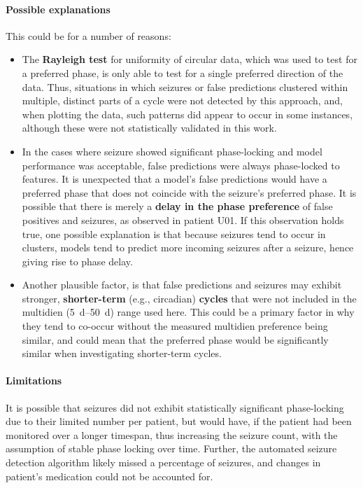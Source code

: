 \paragraph{Possible explanations}
This could be for a number of reasons:
\begin{itemize}
    \item
    The \textbf{Rayleigh test} for uniformity of circular data, which was used to test for a preferred phase, is only able to test for a single preferred direction of the data.
    Thus, situations in which seizures or false predictions clustered within multiple, distinct parts of a cycle were not detected by this approach, and, when plotting the data, such patterns did appear to occur in some instances, although these were not statistically validated in this work.

    \item
    In the cases where seizure showed significant phase-locking and model performance was acceptable, false predictions were always phase-locked to features. 
    It is unexpected that a model's false predictions would have a preferred phase that does not coincide with the seizure's preferred phase.
    It is possible that there is merely a \textbf{delay in the phase preference} of false positives and seizures, as observed in patient U01.
    If this observation holds true, one possible explanation is that because seizures tend to occur in clusters, models tend to predict more incoming seizures after a seizure, hence giving rise to phase delay.

    \item 
    Another plausible factor, is that false predictions and seizures may exhibit stronger, \textbf{shorter-term} (e.g., circadian) \textbf{cycles} that were not included in the multidien (\SIrange{5}{50}{\day}) range used here.
    This could be a primary factor in why they tend to co-occur without the measured multidien preference being similar, and could mean that the preferred phase would be significantly similar when investigating shorter-term cycles.
\end{itemize}


\paragraph{Limitations}
It is possible that seizures did not exhibit statistically significant phase-locking due to their limited number per patient, but would have, if the patient had been monitored over a longer timespan, thus increasing the seizure count, with the assumption of stable phase locking over time.
Further, the automated seizure detection algorithm likely missed a percentage of seizures, and changes in patient's medication could not be accounted for.


